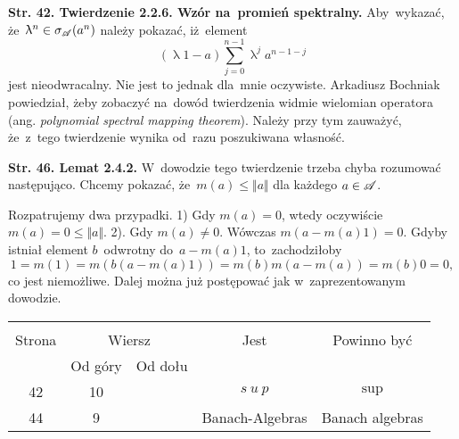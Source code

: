 \documentclass[a4paper,11pt]{article}
\numberwithin{equation}{section}
\renewcommand{\lambda}{\uplambda}
\begin{document}


\noindent
\textbf{Str. 42. Twierdzenie 2.2.6. Wzór na~promień spektralny.}
Aby~wykazać, że~$\lambda^{ n } \in \sigma_{ \Acal }( a^{ n })$
należy pokazać, iż~element
\begin{equation}
  \label{eq:DE-1}
  ( \lambda 1 - a ) \sum_{ j = 0 }^{ n - 1 } \lambda^{ j } a^{ n - 1 - j }
\end{equation}
jest nieodwracalny. Nie jest to jednak dla~mnie oczywiste. Arkadiusz
Bochniak powiedział, żeby zobaczyć na~dowód twierdzenia widmie
wielomian operatora (ang. \textit{polynomial spectral mapping
  theorem}). Należy przy tym zauważyć, że~z~tego twierdzenie wynika
od~razu poszukiwana własność.

\VerSpaceFour





\noindent
\textbf{Str. 46. Lemat 2.4.2.} W~dowodzie tego twierdzenie trzeba
chyba rozumować następująco. Chcemy pokazać,
że~$m( a ) \leq \Vert a \Vert$ dla każdego $a \in \mathcal{A}$.

Rozpatrujemy dwa przypadki. 1) Gdy $m( a ) = 0$, wtedy oczywiście
$m( a ) = 0 \leq \Vert a \Vert$. 2). Gdy $m( a ) \neq 0$. Wówczas
$m( a - m( a ) 1 ) = 0$. Gdyby istniał element $b$~odwrotny
do~$a - m( a ) 1$, to~zachodziłoby
\begin{equation}
  \label{eq:DE-2}
  1 = m( 1 ) = m( b ( a - m( a ) 1 ) ) = m( b ) m( a - m( a ) ) =
  m( b ) 0 = 0,
\end{equation}
co jest niemożliwe. Dalej można już postępować jak w~zaprezentowanym
dowodzie.







\begin{center}

  \begin{tabular}{|c|c|c|c|c|}
    \hline
    & \multicolumn{2}{c|}{} & & \\
    Strona & \multicolumn{2}{c|}{Wiersz} & Jest
                              & Powinno być \\ \cline{2-3}
    & Od góry & Od dołu & & \\
    \hline
    42  & 10 & & $s\: u\: p$ & $\sup$ \\
    44  &  9 & & Banach-Algebras & Banach algebras \\
    \hline
  \end{tabular}

\end{center}
\end{document}
